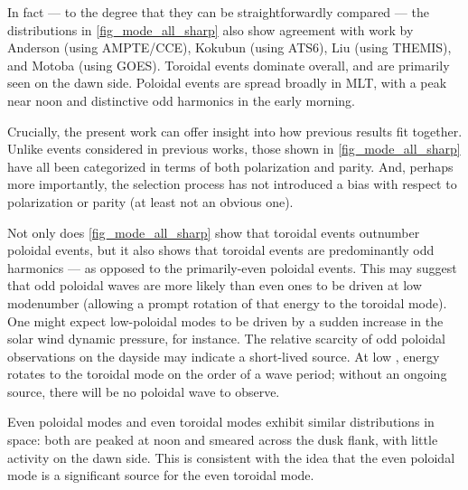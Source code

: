 In fact --- to the degree that they can be straightforwardly compared --- the distributions in \cref{fig_mode_all_sharp} also show agreement with work by Anderson (using AMPTE/CCE\cite{anderson_1990}), Kokubun (using ATS6\cite{kokubun_1989}), Liu (using THEMIS\cite{liu_2009}), and Motoba (using GOES\cite{motoba_2015}). Toroidal events dominate overall, and are primarily seen on the dawn side. Poloidal events are spread broadly in MLT, with a peak near noon and distinctive odd harmonics in the early morning. 

Crucially, the present work can offer insight into how previous results fit together. Unlike events considered in previous works, those shown in \cref{fig_mode_all_sharp} have all been categorized in terms of both polarization and parity. And, perhaps more importantly, the selection process has not introduced a bias with respect to polarization or parity (at least not an obvious one). 

Not only does \cref{fig_mode_all_sharp} show that toroidal events outnumber poloidal events, but it also shows that toroidal events are predominantly odd harmonics --- as opposed to the primarily-even poloidal events. This may suggest that odd poloidal waves are more likely than even ones to be driven at low modenumber (allowing a prompt rotation of that energy to the toroidal mode). One might expect low-\azm poloidal modes to be driven by a sudden increase in the solar wind dynamic pressure, for instance. The relative scarcity of odd poloidal observations on the dayside may indicate a short-lived source. At low \azm, energy rotates to the toroidal mode on the order of a wave period; without an ongoing source, there will be no poloidal wave to observe. 


Even poloidal modes and even toroidal modes exhibit similar distributions in space: both are peaked at noon and smeared across the dusk flank, with little activity on the dawn side. This is consistent with the idea that the even poloidal mode is a significant source for the even toroidal mode. 




